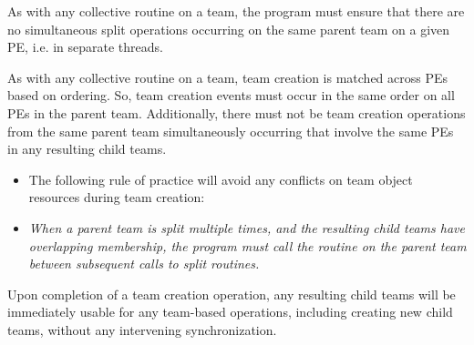 As with any collective routine on a team, the program must ensure that there
are no simultaneous split operations occurring on the same parent team on a
given \ac{PE}, i.e. in separate threads.

As with any collective routine on a team, team creation is matched across PEs based
on ordering. So, team creation events must occur in the same order on all \acp{PE}
in the parent team. Additionally, there must not be team creation
operations from the same parent team simultaneously occurring that involve
the same \acp{PE} in any resulting child teams.

\begin{itemize}
\item[] The following rule of practice will avoid any conflicts on team
object resources during team creation:
\item[] \emph{When a parent team is split multiple times, and the resulting child teams
have overlapping membership, the program must call the 
routine on the parent team between subsequent calls to split routines.}
\end{itemize}

Upon completion of a team creation operation, any resulting child teams will be
immediately usable for any team-based operations, including creating new child teams,
without any intervening synchronization.
